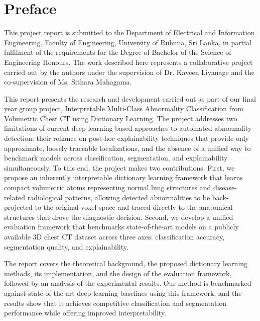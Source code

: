 
\chapter*{Preface}

This project report is submitted to the Department of Electrical and Information Engineering, Faculty of Engineering, University of Ruhuna, Sri Lanka, in partial fulfilment of the requirements for the Degree of Bachelor of the Science of Engineering Honours. The work described here represents a collaborative project carried out by the authors under the supervision of Dr. Kaveen Liyanage and the co-supervision of Ms. Sithara Mahagama.

This report presents the research and development carried out as part of our final year group project, Interpretable Multi-Class Abnormality Classification from Volumetric Chest CT using Dictionary Learning. The project addresses two limitations of current deep learning based approaches to automated abnormality detection: their reliance on post-hoc explainability techniques that provide only approximate, loosely traceable localizations, and the absence of a unified way to benchmark models across classification, segmentation, and explainability simultaneously. To this end, the project makes two contributions. First, we propose an inherently interpretable dictionary learning framework that learns compact volumetric atoms representing normal lung structures and disease-related radiological patterns, allowing detected abnormalities to be back-projected to the original voxel space and traced directly to the anatomical structures that drove the diagnostic decision. Second, we develop a unified evaluation framework that benchmarks state-of-the-art models on a publicly available 3D chest CT dataset across three axes: classification accuracy, segmentation quality, and explainability.

The report covers the theoretical background, the proposed dictionary learning methods, its implementation, and the design of the evaluation framework, followed by an analysis of the experimental results. Our method is benchmarked against state-of-the-art deep learning baselines using this framework, and the results show that it achieves competitive classification and segmentation performance while offering improved interpretability.

